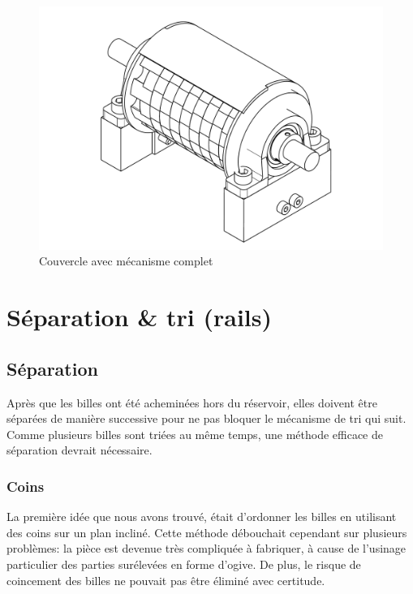 \begin{figure}
    \centering
    \includegraphics[width=\textwidth]{Graphics/Roue/DRAWING_COUVERCLE_COMPLET.pdf}
    \caption{Couvercle avec mécanisme complet}
\end{figure}

\section{Séparation \& tri (rails)}

\subsection{Séparation}
Après que les billes ont été acheminées hors du réservoir, elles doivent être séparées de manière successive pour ne pas bloquer le mécanisme de tri qui suit. Comme plusieurs billes sont triées au même temps, une méthode efficace de séparation devrait nécessaire. 

\subsubsection{Coins}
La première idée que nous avons trouvé, était d'ordonner les billes en utilisant des coins sur un plan incliné. Cette méthode débouchait cependant sur plusieurs problèmes: la pièce est devenue très compliquée à fabriquer, à cause de l'usinage particulier des parties surélevées en forme d'ogive. De plus, le risque de coincement des billes ne pouvait pas être éliminé avec certitude.

